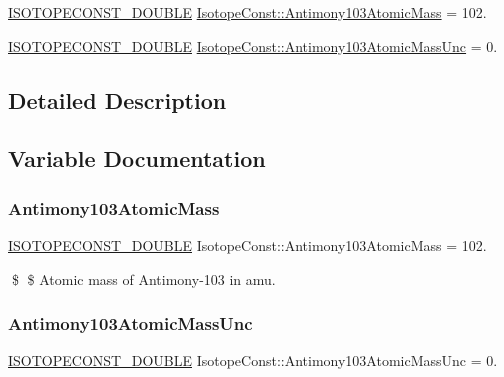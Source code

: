 \begin{DoxyCompactItemize}
\item 
\mbox{\hyperlink{group___isotope_const-_macros_ga8f45a7272ce02c0b4c65c44636ed719a}{I\+S\+O\+T\+O\+P\+E\+C\+O\+N\+S\+T\+\_\+\+D\+O\+U\+B\+LE}} \mbox{\hyperlink{group___isotope_const-_antimony-_sb103_ga190fb404a8c7fad9ee1512d55fb2a297}{Isotope\+Const\+::\+Antimony103\+Atomic\+Mass}} = 102.
\item 
\mbox{\hyperlink{group___isotope_const-_macros_ga8f45a7272ce02c0b4c65c44636ed719a}{I\+S\+O\+T\+O\+P\+E\+C\+O\+N\+S\+T\+\_\+\+D\+O\+U\+B\+LE}} \mbox{\hyperlink{group___isotope_const-_antimony-_sb103_ga8121d7068dc2f0e2adc5899984bf2e11}{Isotope\+Const\+::\+Antimony103\+Atomic\+Mass\+Unc}} = 0.
\end{DoxyCompactItemize}


\subsection{Detailed Description}


\subsection{Variable Documentation}
\mbox{\label{group___isotope_const-_antimony-_sb103_ga190fb404a8c7fad9ee1512d55fb2a297}} 
\subsubsection{\texorpdfstring{Antimony103\+Atomic\+Mass}{Antimony103AtomicMass}}
{\footnotesize\ttfamily \mbox{\hyperlink{group___isotope_const-_macros_ga8f45a7272ce02c0b4c65c44636ed719a}{I\+S\+O\+T\+O\+P\+E\+C\+O\+N\+S\+T\+\_\+\+D\+O\+U\+B\+LE}} Isotope\+Const\+::\+Antimony103\+Atomic\+Mass = 102.}

\$ \$ Atomic mass of Antimony-\/103 in amu. \mbox{\label{group___isotope_const-_antimony-_sb103_ga8121d7068dc2f0e2adc5899984bf2e11}} 
\subsubsection{\texorpdfstring{Antimony103\+Atomic\+Mass\+Unc}{Antimony103AtomicMassUnc}}
{\footnotesize\ttfamily \mbox{\hyperlink{group___isotope_const-_macros_ga8f45a7272ce02c0b4c65c44636ed719a}{I\+S\+O\+T\+O\+P\+E\+C\+O\+N\+S\+T\+\_\+\+D\+O\+U\+B\+LE}} Isotope\+Const\+::\+Antimony103\+Atomic\+Mass\+Unc = 0.}

